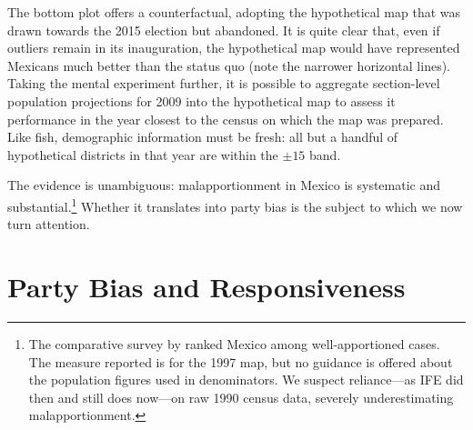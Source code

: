 \documentclass[letter,12pt]{article}
\begin{document}
The bottom plot offers a counterfactual, adopting the hypothetical map that was drawn towards the 2015 election but abandoned. It is quite clear that, even if outliers remain in its inauguration, the hypothetical map would have represented Mexicans much better than the status quo (note the narrower horizontal lines). Taking the mental experiment further, it is possible to aggregate section-level population projections for 2009 into the hypothetical map to assess it performance in the year closest to the census on which the map was prepared. Like fish, demographic information must be fresh: all but a handful of hypothetical districts in that year are within the $\pm15$ band. 

The evidence is unambiguous: malapportionment in Mexico is systematic and substantial.\footnote{The comparative survey by \citet{snyder.samuelsMalapp2004} ranked Mexico among well-apportioned cases. The measure reported is for the 1997 map, but no guidance is offered about the population figures used in denominators. We suspect reliance---as IFE did then and still does now---on raw 1990 census data, severely underestimating malapportionment.} Whether it translates into party bias is the subject to which we now turn attention. 

\section{Party Bias and Responsiveness}
\end{document}
